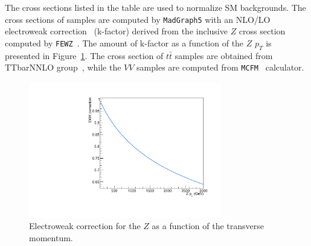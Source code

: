 The cross sections listed in the table are used to normalize SM backgrounds. The cross sections of \Zjets samples are computed by \texttt{MadGraph5} with an NLO/LO electroweak correction~\cite{Kallweit:2015dum} (k-factor) derived from the inclusive $Z$ cross section computed by \texttt{FEWZ}~\cite{Gavin:2010az}. The amount of k-factor as a function of the $Z$ $p_T$ is presented in Figure~\ref{fig:EWfactor}. The cross section of $t\bar{t}$ samples are obtained from TTbarNNLO group~\cite{Khachatryan:2015oqa}, while the $VV$ samples are computed from \texttt{MCFM}~\cite{Campbell:2010ff} calculator.

\begin{figure}[t]
  \centering
  \includegraphics[width=0.75\textwidth]{Figures/EWfactor.pdf}
  \caption{Electroweak correction for the $Z$ as a function of the transverse momentum.}
  \label{fig:EWfactor}
\end{figure}

